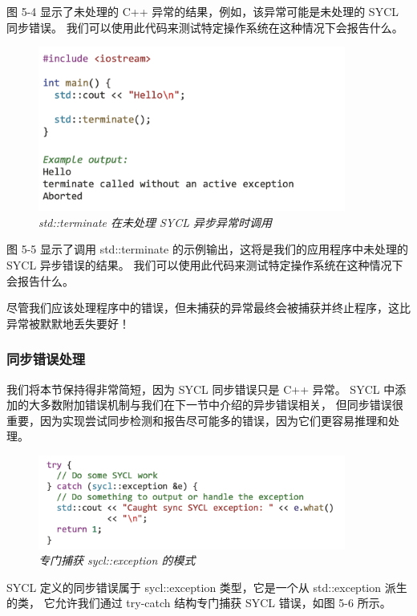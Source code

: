 图 5-4 显示了未处理的 C++ 异常的结果，例如，该异常可能是未处理的 SYCL 同步错误。 
我们可以使用此代码来测试特定操作系统在这种情况下会报告什么。

\begin{figure}[H]
	\centering
	\includegraphics[width=0.9\textwidth]{figs/F5.5.png}
	\caption{\textit{std::terminate 在未处理 SYCL 异步异常时调用}}
\end{figure}

图 5-5 显示了调用 std::terminate 的示例输出，这将是我们的应用程序中未处理的 SYCL 异步错误的结果。 
我们可以使用此代码来测试特定操作系统在这种情况下会报告什么。

尽管我们应该处理程序中的错误，但未捕获的异常最终会被捕获并终止程序，这比异常被默默地丢失要好！

\subsubsection{同步错误处理}
我们将本节保持得非常简短，因为 SYCL 同步错误只是 C++ 异常。 
SYCL 中添加的大多数附加错误机制与我们在下一节中介绍的异步错误相关，
但同步错误很重要，因为实现尝试同步检测和报告尽可能多的错误，因为它们更容易推理和处理。

\begin{figure}[H]
	\centering
	\includegraphics[width=0.9\textwidth]{figs/F5.6.png}
	\caption{\textit{专门捕获 sycl::exception 的模式}}
\end{figure}

SYCL 定义的同步错误属于 sycl::exception 类型，它是一个从 std::exception 派生的类，
它允许我们通过 try-catch 结构专门捕获 SYCL 错误，如图 5-6 所示。

